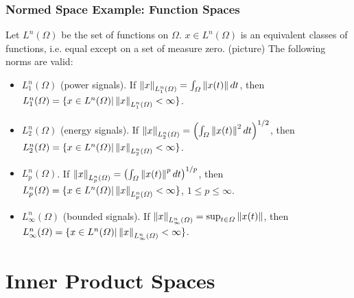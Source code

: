 \documentclass{beamer}
\begin{document}
\begin{frame}\frametitle{Normed Space Example: Function Spaces}
Let $L^n(\Omega)$ be the set of functions on $\Omega$. $x\in L^n(\Omega)$ is an equivalent classes of functions, i.e. equal except on a set of measure zero.  (picture)  The following norms are valid:
\begin{itemize}
\item 	$L_1^n(\Omega)$ (power signals).  If $\left\|x\right\|_{L_1^n(\Omega)} = \int_{\Omega}\left\| x(t)\right\|  dt$, then $L_1^n(\Omega) = \{ x\in L^n(\Omega)| \left\|x\right\|_{L_1^n(\Omega)} < \infty \}$.
\item $L_2^n(\Omega)$ (energy signals).  If $\left\|x\right\|_{L_2^n(\Omega)} = \left(\int_{\Omega}\left\| x(t)\right\|^2  dt\right)^{1/2}$, then $L_2^n(\Omega) = \{ x\in L^n(\Omega)| \left\|x\right\|_{L_2^n(\Omega)} < \infty \}$.
\item $L_p^n(\Omega)$.  If $\left\|x\right\|_{L_p^n(\Omega)} = \left(\int_{\Omega}\left\| x(t)\right\|^p  dt\right)^{1/p}$, then $L_p^n(\Omega) = \{ x\in L^n(\Omega)| \left\|x\right\|_{L_p^n(\Omega)} < \infty \}$, $1\leq p \leq \infty$.
\item 	$L_\infty^n(\Omega)$ (bounded signals).  If $\left\|x\right\|_{L_\infty^n(\Omega)} = \sup_{t\in\Omega}\left\| x(t)\right\|$, then $L_\infty^n(\Omega) = \{ x\in L^n(\Omega)| \left\|x\right\|_{L_\infty^n(\Omega)} < \infty \}$.
\end{itemize}
\end{frame}

\section{Inner Product Spaces}
\frame{\sectionpage}
\end{document}
